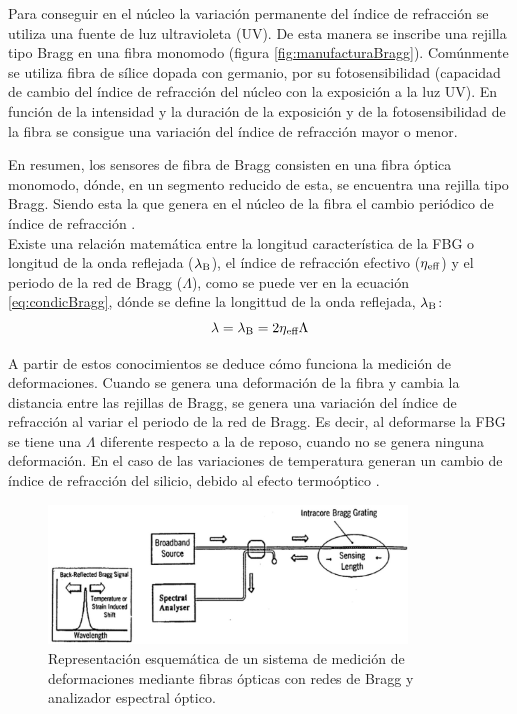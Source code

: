 \begin{itemize}
		 Para conseguir en el núcleo la variación permanente del índice de refracción se utiliza una fuente de luz ultravioleta (UV). De esta manera se inscribe una rejilla tipo Bragg en una fibra monomodo (figura \ref{fig:manufacturaBragg}). Comúnmente se utiliza fibra de sílice dopada con germanio, por su fotosensibilidad (capacidad de cambio del índice de refracción del núcleo con la exposición a la luz UV). En función de la intensidad y la duración de la exposición y de la fotosensibilidad de la fibra se consigue una variación del índice de refracción mayor o menor. 
		
		En resumen, los sensores de fibra de Bragg consisten en una fibra óptica monomodo, dónde, en un segmento reducido de esta, se encuentra una rejilla tipo Bragg. Siendo esta la que genera en el núcleo de la fibra el cambio periódico de índice de refracción \cite{defFBG}.\\
		
		Existe una relación matemática entre la longitud característica de la FBG o longitud de la onda reflejada ($\lambda\textsubscript{B}$), el índice de refracción efectivo ($\eta\textsubscript{eff}$) y el periodo de la red de Bragg ($\Lambda$), como se puede ver en la ecuación \ref{eq:condicBragg}, dónde se define la longittud de la onda reflejada, $\lambda\textsubscript{B}$: 
			\begin{equation}
				\label{eq:condicBragg}
				\lambda=\lambda\textsubscript{B} = 2\eta\textsubscript{eff}\Lambda	
			\end{equation}
				
		A partir de estos conocimientos se deduce cómo funciona la medición de deformaciones. Cuando se genera una deformación de la fibra y cambia la distancia entre las rejillas de Bragg, se genera una variación del índice de refracción al variar el periodo de la red de Bragg. Es decir, al deformarse la FBG se tiene una $\Lambda$ diferente respecto a la de reposo, cuando no se genera ninguna deformación. En el caso de las variaciones de temperatura generan un cambio de índice de refracción del silicio, debido al efecto termoóptico \cite{termoDeformFBG}. 
		
		\begin{figure}[H]
			\centering
			\includegraphics[width=0.85\textwidth]{./img/medicBragg}
			\caption{Representación esquemática de un sistema de  medición de deformaciones mediante fibras ópticas con redes de Bragg y analizador espectral óptico. \cite{tesisUPMmalte}} 
			\label{fig:medicBragg}
		\end{figure}
		

\end{itemize}
